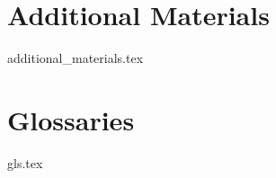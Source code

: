 \documentclass[a4paper]{ustthesis}
\begin{document}
%
%
%


\newpage

\appendix
\chapter{Additional Materials}
\label{ch_AdditionalMaterials}
{additional_materials.tex}
\newpage


\chapter{Glossaries}
\label{ch_glossaries}
{gls.tex}
\end{document}
